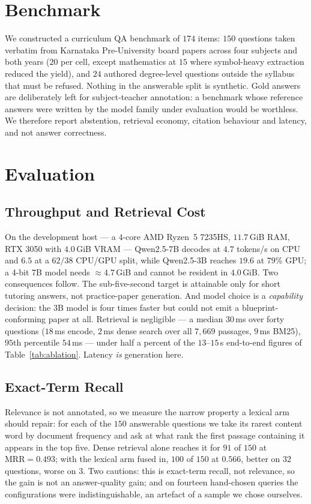 \documentclass[conference]{IEEEtran}
\begin{document}
\section{Benchmark}
We constructed a curriculum QA benchmark of $174$ items: $150$ questions taken
verbatim from Karnataka Pre-University board papers across four subjects and
both years ($20$ per cell, except mathematics at $15$ where symbol-heavy
extraction reduced the yield), and $24$ authored degree-level questions outside
the syllabus that must be refused. Nothing in the answerable split is synthetic.
Gold answers are deliberately left for subject-teacher annotation: a benchmark
whose reference answers were written by the model family under evaluation would
be worthless. We therefore report abstention, retrieval economy, citation
behaviour and latency, and not answer correctness.

\section{Evaluation}
\subsection{Throughput and Retrieval Cost}
On the development host --- a $4$-core AMD Ryzen~5 7235HS, $11.7$\,GiB RAM, RTX
3050 with $4.0$\,GiB VRAM --- Qwen2.5-7B decodes at $4.7$ tokens/s on CPU and
$6.5$ at a $62/38$ CPU/GPU split, while Qwen2.5-3B reaches $19.6$ at $79\%$ GPU;
a 4-bit $7$B model needs $\approx 4.7$\,GiB and cannot be resident in $4.0$\,GiB.
Two consequences follow. The sub-five-second target is attainable only for short
tutoring answers, not practice-paper generation. And model choice is a
\emph{capability} decision: the $3$B model is four times faster but could not
emit a blueprint-conforming paper at all. Retrieval is negligible --- a median
$30$\,ms over forty questions ($18$\,ms encode, $2$\,ms dense search over all
$7{,}669$ passages, $9$\,ms BM25), $95$th percentile $54$\,ms --- under half a
percent of the $13$--$15$\,s end-to-end figures of Table~\ref{tab:ablation}.
Latency \emph{is} generation here.

\subsection{Exact-Term Recall}
Relevance is not annotated, so we measure the narrow property a lexical arm
should repair: for each of the $150$ answerable questions we take its rarest
content word by document frequency and ask at what rank the first passage
containing it appears in the top five. Dense retrieval alone reaches it for $91$
of $150$ at $\mathrm{MRR} = 0.493$; with the lexical arm fused in, $100$ of
$150$ at $0.566$, better on $32$ questions, worse on $3$. Two cautions: this is
exact-term recall, not relevance, so the gain is not an answer-quality gain; and
on fourteen hand-chosen queries the configurations were indistinguishable, an
artefact of a sample we chose ourselves.
\end{document}

